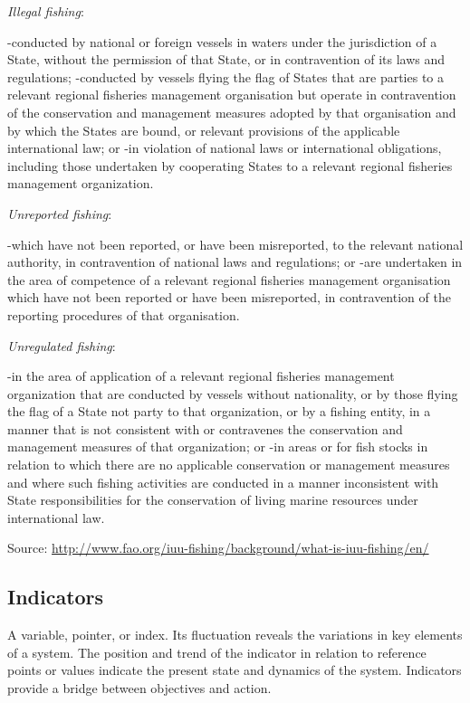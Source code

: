 \documentclass[
  11pt,
]{book}
\begin{document}
\emph{Illegal fishing}:

-conducted by national or foreign vessels in waters under the jurisdiction of a State, without the permission of that State, or in contravention of its laws and regulations;
-conducted by vessels flying the flag of States that are parties to a relevant regional fisheries management organisation but operate in contravention of the conservation and management measures adopted by that organisation and by which the States are bound, or relevant provisions of the applicable international law; or
-in violation of national laws or international obligations, including those undertaken by cooperating States to a relevant regional fisheries management organization.

\emph{Unreported fishing}:

-which have not been reported, or have been misreported, to the relevant national authority, in contravention of national laws and regulations; or
-are undertaken in the area of competence of a relevant regional fisheries management organisation which have not been reported or have been misreported, in contravention of the reporting procedures of that organisation.

\emph{Unregulated fishing}:

-in the area of application of a relevant regional fisheries management organization that are conducted by vessels without nationality, or by those flying the flag of a State not party to that organization, or by a fishing entity, in a manner that is not consistent with or contravenes the conservation and management measures of that organization; or
-in areas or for fish stocks in relation to which there are no applicable conservation or management measures and where such fishing activities are conducted in a manner inconsistent with State responsibilities for the conservation of living marine resources under international law.

Source: \url{http://www.fao.org/iuu-fishing/background/what-is-iuu-fishing/en/}

\hypertarget{indicators}{%
\subsection{Indicators}\label{indicators}}

A variable, pointer, or index. Its fluctuation reveals the variations in key elements of a system. The position and trend of the indicator in relation to reference points or values indicate the present state and dynamics of the system. Indicators provide a bridge between objectives and action.
\end{document}
